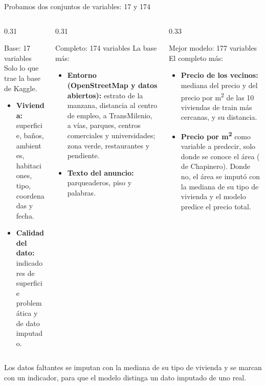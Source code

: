 \documentclass[aspectratio=169, 10pt]{beamer}
\newcommand{\nota}[1]{\vfill{\scriptsize\color{black!60}#1\par}}
\begin{document}
\begin{frame}{Probamos dos conjuntos de variables: 17 y 174}
  \vspace{1mm}
  \begin{columns}[T, onlytextwidth]
    \begin{column}{0.31\textwidth}
      \begin{block}{Base: 17 variables}
        \footnotesize
        Solo lo que trae la base de Kaggle.
        \begin{itemize}\setlength{\itemsep}{1pt}
          \item \textbf{Vivienda:} superficie, ba\~nos, ambientes, habitaciones, tipo, coordenadas y fecha.
          \item \textbf{Calidad del dato:} indicadores de superficie problem\'atica y de dato imputado.
        \end{itemize}
      \end{block}
    \end{column}
    \begin{column}{0.31\textwidth}
      \begin{block}{Completo: 174 variables}
        \footnotesize
        La base m\'as:
        \begin{itemize}\setlength{\itemsep}{1pt}
          \item \textbf{Entorno (OpenStreetMap y datos abiertos):} estrato de la manzana, distancia al centro de empleo, a TransMilenio, a v\'ias, parques, centros comerciales y universidades; zona verde, restaurantes y pendiente.
          \item \textbf{Texto del anuncio:} parqueaderos, piso y \NRaices{} palabras.
        \end{itemize}
      \end{block}
    \end{column}
    \begin{column}{0.33\textwidth}
      \begin{block}{Mejor modelo: 177 variables}
        \footnotesize
        El completo m\'as:
        \begin{itemize}\setlength{\itemsep}{1pt}
          \item \textbf{Precio de los vecinos:} mediana del precio y del precio por m\textsuperscript{2} de las 10 viviendas de train m\'as cercanas, y su distancia.
          \item \textbf{Precio por m\textsuperscript{2}} como variable a predecir, solo donde se conoce el \'area (\PctSuperficieReal{} de Chapinero). Donde no, el \'area se imput\'o con la mediana de su tipo de vivienda y el modelo predice el precio total.
        \end{itemize}
      \end{block}
    \end{column}
  \end{columns}
  \nota{Los datos faltantes se imputan con la mediana de su tipo de vivienda y se marcan con un indicador, para que el modelo distinga un dato imputado de uno real.}
\end{frame}
\end{document}
